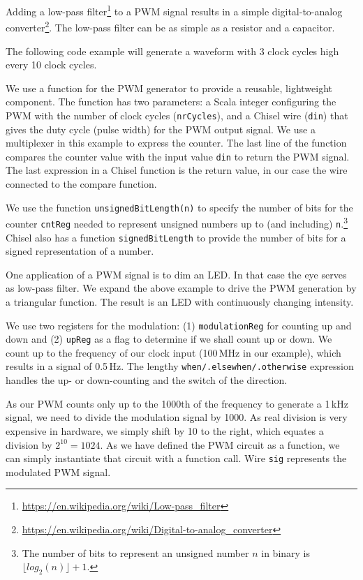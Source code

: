 \documentclass[%
    10pt,
    headinclude, footexclude,
    openright, %
    notitlepage,
    cleardoubleempty,
    headsepline,
    pointlessnumbers,
    bibtotoc, idxtotoc,
    ]{scrbook}
\newcommand{\code}[1]{{\small{\texttt{#1}}}}
\newcommand{\myref}[2]{\href{#1}{#2}}
\renewcommand{\myref}[2]{{#2}{\footnote{\url{#1}}}}
\begin{document}
Adding a \myref{https://en.wikipedia.org/wiki/Low-pass_filter}{low-pass filter} to a PWM
signal results in a simple
\myref{https://en.wikipedia.org/wiki/Digital-to-analog_converter}{digital-to-analog converter}.
The low-pass filter can be as simple as a resistor and a capacitor.

The following code example will generate a waveform with 3 clock cycles high every 10 clock cycles.


\noindent We use a function for the PWM generator to provide a reusable, lightweight component.
The function has two parameters: a Scala integer configuring the PWM with the number of
clock cycles (\code{nrCycles}), and a Chisel wire (\code{din}) that gives the duty cycle (pulse width) for the
PWM output signal. We use a multiplexer in this
example to express the counter. The last line of the function compares the counter value
with the input value \code{din} to return the PWM signal. The last expression in a Chisel function
is the return value, in our case the wire connected to the compare function.

We use the function \code{unsignedBitLength(n)} to specify the number of bits for the counter
\code{cntReg} needed to represent unsigned numbers up to (and including)
\code{n}.\footnote{The number of bits to represent an unsigned number $n$ in binary is $\lfloor log_2(n) \rfloor + 1$.}
Chisel also has a function \code{signedBitLength} to provide the number of bits
for a signed representation of a number.


One application of a PWM signal is to dim an LED. In that case the eye serves as low-pass
filter. We expand the above example to drive the PWM generation by a triangular function.
The result is an LED with continuously changing intensity.


We use two registers for the modulation: (1) \code{modulationReg} for counting up and down
and (2) \code{upReg} as a flag to determine if we shall count up or down. We count up
to the frequency of our clock input (100\,MHz in our example), which results in a signal
of 0.5\,Hz. The lengthy \code{when/.elsewhen/.otherwise} expression handles the up- or
down-counting and the switch of the direction.

As our PWM counts only up to the 1000th of the frequency to generate a 1\,kHz signal,
we need to divide the modulation signal by 1000. As real division is very expensive in hardware,
we simply shift by 10 to the right, which equates a division by $2^{10} = 1024$.
As we have defined the PWM circuit as a function, we can simply instantiate that circuit
with a function call. Wire \code{sig} represents the modulated PWM signal.
\end{document}
